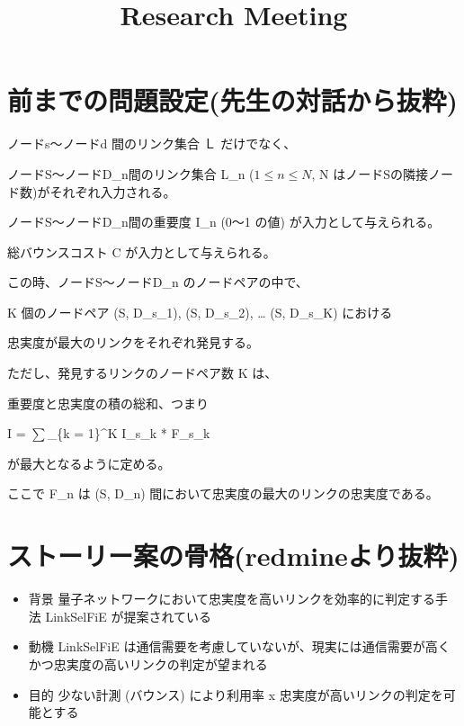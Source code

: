 \documentclass[conference]{IEEEtran}
\begin{document}
\title{Research Meeting}

\author{
}

\maketitle

\section*{前までの問題設定(先生の対話から抜粋)}
\label{sec:org369580b}
ノードs〜ノードd 間のリンク集合 Ｌ だけでなく、

ノードS〜ノードD\_n間のリンク集合 L\_n (\(1 \le n \le N\), N はノードSの隣接ノード数)がそれぞれ入力される。

ノードS〜ノードD\_n間の重要度 I\_n (0〜1 の値) が入力として与えられる。

総バウンスコスト C が入力として与えられる。

この時、ノードS〜ノードD\_n のノードペアの中で、

K 個のノードペア (S, D\_s\_1), (S, D\_s\_2), \ldots{} (S, D\_s\_K) における

忠実度が最大のリンクをそれぞれ発見する。

ただし、発見するリンクのノードペア数 K は、

重要度と忠実度の積の総和、つまり

I = \(\sum\)\_\{k = 1\}\^{}K I\_s\_k * F\_s\_k

が最大となるように定める。

ここで F\_n は (S, D\_n) 間において忠実度の最大のリンクの忠実度である。


\section*{ストーリー案の骨格(redmineより抜粋)}
\label{sec:org74e6c89}

\begin{itemize}
\item 背景 量子ネットワークにおいて忠実度を高いリンクを効率的に判定する手法 LinkSelFiE が提案されている
\item 動機 LinkSelFiE は通信需要を考慮していないが、現実には通信需要が高くかつ忠実度の高いリンクの判定が望まれる
\item 目的 少ない計測 (バウンス) により利用率 x 忠実度が高いリンクの判定を可能とする
\end{itemize}
\end{document}
